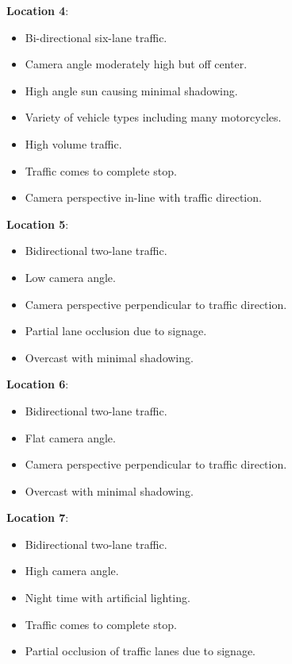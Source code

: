 \textbf{Location 4}:

\begin{itemize}
    \item Bi-directional six-lane traffic.
    \item Camera angle moderately high but off center.
    \item High angle sun causing minimal shadowing.
    \item Variety of vehicle types including many motorcycles.
    \item High volume traffic.
    \item Traffic comes to complete stop.
    \item Camera perspective in-line with traffic direction.
\end{itemize}


\textbf{Location 5}:

\begin{itemize}
    \item Bidirectional two-lane traffic.
    \item Low camera angle.
    \item Camera perspective perpendicular to traffic direction.
    \item Partial lane occlusion due to signage.
    \item Overcast with minimal shadowing.
\end{itemize}


\textbf{Location 6}:

\begin{itemize}
    \item Bidirectional two-lane traffic.
    \item Flat camera angle.
    \item Camera perspective perpendicular to traffic direction.
    \item Overcast with minimal shadowing.
\end{itemize}

\textbf{Location 7}:

\begin{itemize}
    \item Bidirectional two-lane traffic.
    \item High camera angle.
    \item Night time with artificial lighting.
    \item Traffic comes to complete stop.
    \item Partial occlusion of traffic lanes due to signage.
\end{itemize}


